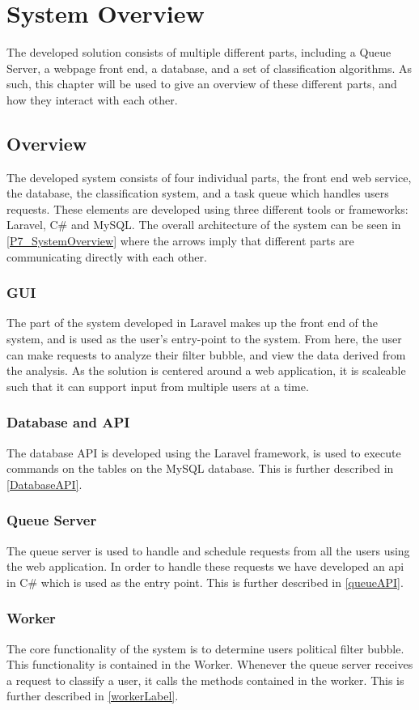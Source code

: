 \chapter{System Overview}
The developed solution consists of multiple different parts, including a Queue
Server, a webpage front end, a database, and a set of classification algorithms.
As such, this chapter will be used to give an overview of these different parts,
and how they interact with each other.

\section{Overview}
The developed system consists of four individual parts, the front end web
service, the database, the classification system, and a task queue which handles
users requests. These elements are developed using three different tools or
frameworks: Laravel, C\# and MySQL. The overall architecture of the system can
be seen in \autoref{P7_SystemOverview} where the arrows imply that different parts
are communicating directly with each other.
 

\subsection{GUI} %
The part of the system developed in Laravel makes up the front end of the
system, and is used as the user's entry-point to the system. From here, the user can
make requests to analyze their filter bubble, and view the data derived from
the analysis. As the solution is centered around a web application, it is
scaleable such that it can support input from multiple users at a time.\nl

\subsection{Database and API}
The database API is developed using the Laravel framework, is used to execute
commands on the tables on the MySQL database. This is further described in
\autoref{DatabaseAPI}.

\subsection{Queue Server}
The queue server is used to handle and schedule requests from all the users
using the web application. In order to handle these requests we have developed
an api in C\# which is used as the entry point. This is further described in
\autoref{queueAPI}. 

\subsection{Worker}
The core functionality of the system is to determine users political filter
bubble. This functionality is contained in the Worker. Whenever the queue server
receives a request to classify a user, it calls the methods contained in the
worker. This is further described in \autoref{workerLabel}.
